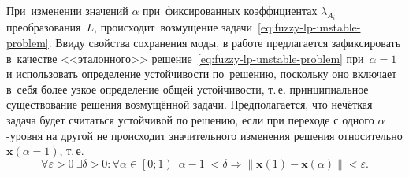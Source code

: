При~изменении значений $\alpha$ при~фиксированных коэффициентах $\lambda_{A_i}$ преобразования~$L$, происходит~возмущение задачи~\eqref{eq:fuzzy-lp-unstable-problem}. Ввиду свойства сохранения моды, в работе предлагается зафиксировать в~качестве <<эталонного>> решение~\eqref{eq:fuzzy-lp-unstable-problem} при~$\alpha=1$ и использовать определение устойчивости по~решению, поскольку оно включает в~себя более узкое определение общей устойчивости, т.\,е. принципиальное существование решения возмущённой задачи. Предполагается, что нечёткая задача будет считаться устойчивой по решению, если при переходе с одного $\alpha$-уровня на другой не происходит значительного изменения решения относительно $\mathbf{x}\left( \alpha =1 \right)$, т.\,е.
\begin{equation}
\label{eq:fuzzy-solution-stability}
  \forall \varepsilon >0\ \exists \delta >0:\forall \alpha \in \left[0; 1\right)\ \left| \alpha -1 \right|<\delta \Rightarrow \left\| \mathbf{x}\left( 1 \right)-\mathbf{x}\left( \alpha  \right) \right\|<\varepsilon.
\end{equation}

